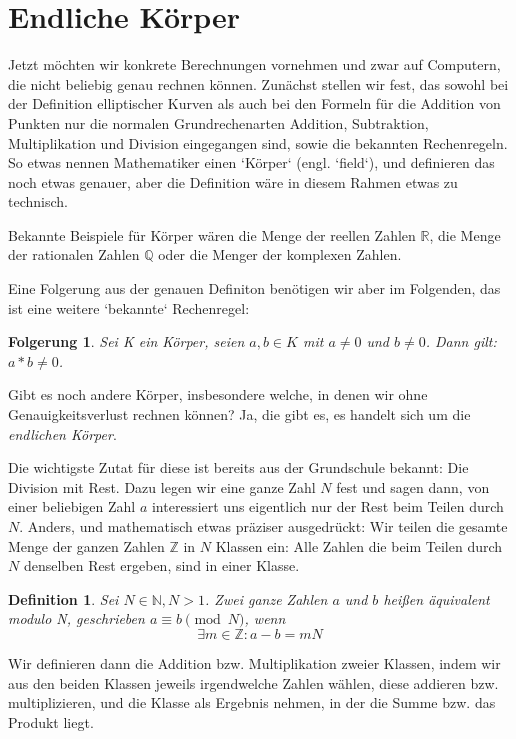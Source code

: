 \documentclass{article}
\newcommand{\N}{\mathbb{N}}
\newcommand{\Q}{\mathbb{Q}}
\newcommand{\R}{\mathbb{R}}
\newcommand{\Z}{\mathbb{Z}}
\newcounter{thm}
\newtheorem{folgerung}[thm]{Folgerung}
\newtheorem{definition}[thm]{Definition}
\begin{document}
\section{Endliche Körper}

Jetzt möchten wir konkrete Berechnungen vornehmen und zwar auf Computern,
die nicht beliebig genau rechnen können. Zunächst stellen wir fest, das sowohl
bei der Definition elliptischer Kurven als auch bei den Formeln für die
Addition von Punkten nur die normalen Grundrechenarten Addition, Subtraktion,
Multiplikation und Division eingegangen sind, sowie die bekannten
Rechenregeln. So etwas nennen Mathematiker einen `Körper` (engl. `field`), und
definieren das noch etwas genauer, aber die Definition wäre in diesem Rahmen
etwas zu technisch.

Bekannte Beispiele für Körper wären die Menge der reellen
Zahlen $\R$, die Menge der rationalen Zahlen $\Q$ oder die Menger der
komplexen Zahlen.

Eine Folgerung aus der genauen Definiton benötigen wir aber im Folgenden, das
ist eine weitere `bekannte` Rechenregel:

  \begin{folgerung}
    Sei K ein Körper, seien $a, b \in K$ mit $a \ne 0$ und $b \ne 0$.  Dann
    gilt: $a * b \ne 0$.
  \end{folgerung}

Gibt es noch andere Körper, insbesondere welche, in denen wir ohne
Genauigkeitsverlust rechnen können? Ja, die gibt es, es handelt sich um die
\textit{endlichen Körper}.

Die wichtigste Zutat für diese ist bereits aus der Grundschule bekannt: Die
Division mit Rest. Dazu legen wir eine ganze Zahl $N$ fest und sagen dann,
von einer beliebigen Zahl $a$ interessiert uns eigentlich nur der Rest beim
Teilen durch $N$. Anders, und mathematisch etwas präziser ausgedrückt: Wir
teilen die gesamte Menge der ganzen Zahlen $\Z$ in $N$ Klassen ein: Alle Zahlen
die beim Teilen durch $N$ denselben Rest ergeben, sind in einer Klasse.

  \begin{definition}
    Sei $N \in \N, N > 1$. Zwei ganze Zahlen $a$ und $b$ heißen
    \emph{äquivalent modulo N}, geschrieben $a \equiv b \pmod N$, wenn
    $$ \exists m \in \Z: a-b = mN $$
  \end{definition}

Wir definieren dann die Addition bzw. Multiplikation zweier Klassen, indem wir
aus den beiden Klassen jeweils irgendwelche Zahlen wählen, diese addieren
bzw. multiplizieren, und die Klasse als Ergebnis nehmen, in der die Summe
bzw. das Produkt liegt.
\end{document}
